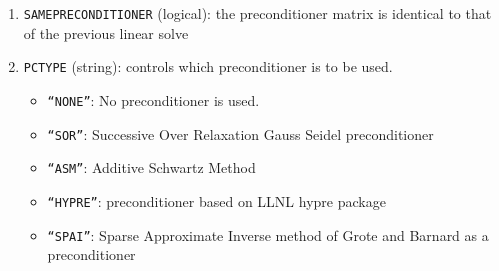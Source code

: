 \documentclass[12pt]{amsart}
\begin{document}
\begin{enumerate}
\item {\tt SAMEPRECONDITIONER} (logical): the preconditioner matrix is identical to that of the previous linear solve
\item {\tt PCTYPE} (string): controls which preconditioner is to be used.
  \begin{itemize}
  \item {\tt ``NONE''}: No preconditioner is used.
  \item {\tt ``SOR''}: Successive Over Relaxation Gauss Seidel preconditioner
  \item {\tt ``ASM''}: Additive Schwartz Method
  \item {\tt ``HYPRE''}: preconditioner based on LLNL hypre package
  \item {\tt ``SPAI''}: Sparse Approximate Inverse method of Grote and Barnard as a preconditioner
  \end{itemize}

    

  
\end{enumerate}




\end{document}

